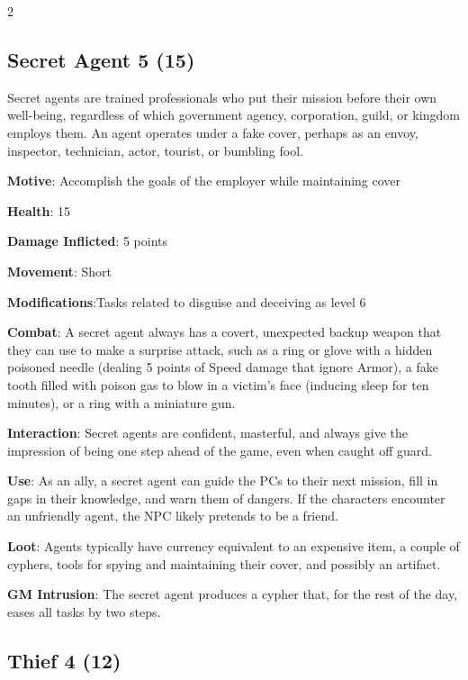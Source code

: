 \begin{multicols}{2}
\subsection{Secret Agent 5 (15)}

Secret agents are trained professionals who put their mission before their own well-being, regardless of which government agency, corporation, guild, or kingdom employs them. An agent operates under a fake cover, perhaps as an envoy, inspector, technician, actor, tourist, or bumbling fool.

\textbf{Motive}: Accomplish the goals of the employer while maintaining cover

\textbf{Health}: 15

\textbf{Damage Inflicted}: 5 points

\textbf{Movement}: Short

\textbf{Modifications}:Tasks related to disguise and deceiving as level 6

\textbf{Combat}: A secret agent always has a covert, unexpected backup weapon that they can use to make a surprise attack, such as a ring or glove with a hidden poisoned needle (dealing 5 points of Speed damage that ignore Armor), a fake tooth filled with poison gas to blow in a victim’s face (inducing sleep for ten minutes), or a ring with a miniature gun.

\textbf{Interaction}: Secret agents are confident, masterful, and always give the impression of being one step ahead of the game, even when caught off guard.

\textbf{Use}: As an ally, a secret agent can guide the PCs to their next mission, fill in gaps in their knowledge, and warn them of dangers. If the characters encounter an unfriendly agent, the NPC likely pretends to be a friend.

\textbf{Loot}: Agents typically have currency equivalent to an expensive item, a couple of cyphers, tools for spying and maintaining their cover, and possibly an artifact.

\textbf{GM Intrusion}: The secret agent produces a cypher that, for the rest of the day, eases all tasks by two steps.

\subsection{Thief 4 (12)}


\end{multicols}
